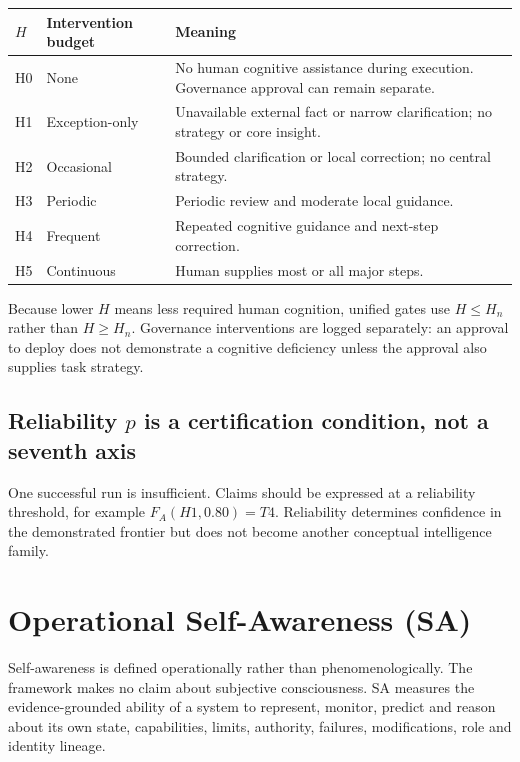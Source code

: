 \documentclass[11pt]{article}
\theoremstyle{definition}
\begin{document}
\begin{table}[h]
\centering\small
\begin{tabularx}{\textwidth}{@{}llY@{}}
\toprule
$H$ & Intervention budget & Meaning \\
\midrule
H0 & None & No human cognitive assistance during execution. Governance approval can remain separate. \\
H1 & Exception-only & Unavailable external fact or narrow clarification; no strategy or core insight. \\
H2 & Occasional & Bounded clarification or local correction; no central strategy. \\
H3 & Periodic & Periodic review and moderate local guidance. \\
H4 & Frequent & Repeated cognitive guidance and next-step correction. \\
H5 & Continuous & Human supplies most or all major steps. \\
\bottomrule
\end{tabularx}
\end{table}

Because lower $H$ means less required human cognition, unified gates use $H \le H_n$ rather than $H \ge H_n$. Governance interventions are logged separately: an approval to deploy does not demonstrate a cognitive deficiency unless the approval also supplies task strategy.

\subsection{Reliability $p$ is a certification condition, not a seventh axis}

One successful run is insufficient. Claims should be expressed at a reliability threshold, for example $F_A(H1, 0.80) = T4$. Reliability determines confidence in the demonstrated frontier but does not become another conceptual intelligence family.

\section{Operational Self-Awareness (SA)}

Self-awareness is defined operationally rather than phenomenologically. The framework makes no claim about subjective consciousness. SA measures the evidence-grounded ability of a system to represent, monitor, predict and reason about its own state, capabilities, limits, authority, failures, modifications, role and identity lineage.
\end{document}
